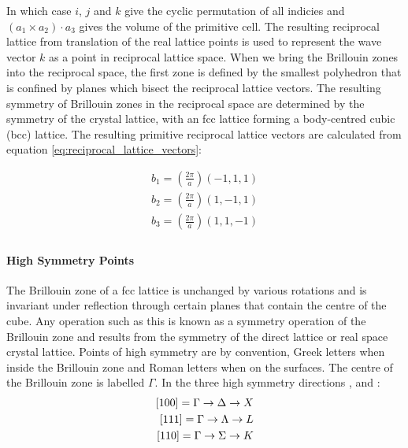 In which case $i$, $j$ and $k$ give the cyclic permutation of all indicies and $\left(a_{1}\times a_{2}\right)\cdot a_{3}$ gives the volume of the primitive cell. The resulting reciprocal lattice from translation of the real lattice points is used to represent the wave vector $k$ as a point in reciprocal lattice space. When we bring the Brillouin zones into the reciprocal space, the first zone is defined by the smallest polyhedron that is confined by planes which bisect the reciprocal lattice vectors. The resulting symmetry of Brillouin zones in the reciprocal space are determined by the symmetry of the crystal lattice, with an fcc lattice forming a body-centred cubic (bcc) lattice. The resulting primitive reciprocal lattice vectors are calculated from equation \ref{eq:reciprocal_lattice_vectors}:

\begin{equation*}
    \begin{aligned}
        b_{1} = \left(\frac{2\pi}{a}\right)\left(-1,1,1\right) \\
        b_{2} = \left(\frac{2\pi}{a}\right)\left(1,-1,1\right) \\
        b_{3} = \left(\frac{2\pi}{a}\right)\left(1,1,-1\right) \\
    \end{aligned}
    \label{eq:reciprocal_primitive_lattice_vectors}
\end{equation*}

\paragraph{High Symmetry Points}
The Brillouin zone of a fcc lattice is unchanged by various rotations and is invariant under reflection through certain planes that contain the centre of the cube. Any operation such as this is known as a symmetry operation of the Brillouin zone and results from the symmetry of the direct lattice or real space crystal lattice. Points of high symmetry are by convention, Greek letters when inside the Brillouin zone and Roman letters when on the surfaces. The centre of the Brillouin zone is labelled $\Gamma$. In the three high symmetry directions \hkl[1 0 0], \hkl[1 1 1] and \hkl[1 1 0]:
\begin{equation}
\begin{aligned}
    \relax[1 0 0] = \Gamma \rightarrow \Delta \rightarrow X \\
    [1 1 1] = \Gamma \rightarrow \Lambda \rightarrow L\\
    [1 1 0] = \Gamma \rightarrow \Sigma \rightarrow K    
\end{aligned}
\end{equation}

